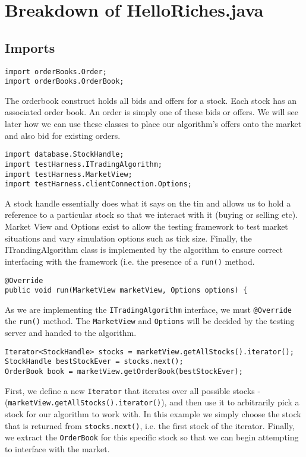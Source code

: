 \documentclass[11pt]{article}
\begin{document}
\section{Breakdown of HelloRiches.java}
\subsection{Imports}
\begin{lstlisting}
import orderBooks.Order;
import orderBooks.OrderBook;
\end{lstlisting}
The orderbook construct holds all bids and offers for a stock. Each stock has an associated order book. An order is simply one of these bids or offers. We will see later how we can use these classes to place our algorithm's offers onto the market and also bid for existing orders.\\
\begin{lstlisting}
import database.StockHandle;
import testHarness.ITradingAlgorithm;
import testHarness.MarketView;
import testHarness.clientConnection.Options;
\end{lstlisting}
A stock handle essentially does what it says on the tin and allows us to hold a reference to a particular stock so that we interact with it (buying or selling etc). Market View and Options exist to allow the testing framework to test market situations and vary simulation options such as tick size. Finally, the ITrandingAlgorithm class is implemented by the algorithm to ensure correct interfacing with the framework (i.e. the presence of a \texttt{run()} method.\\

\begin{lstlisting}
@Override
public void run(MarketView marketView, Options options) {
\end{lstlisting}
As we are implementing the \texttt{ITradingAlgorithm} interface, we must \texttt{@Override} the \texttt{run()} method. The \texttt{MarketView} and \texttt{Options} will be decided by the testing server and handed to the algorithm. \\

\begin{lstlisting}
Iterator<StockHandle> stocks = marketView.getAllStocks().iterator();
StockHandle bestStockEver = stocks.next();
OrderBook book = marketView.getOrderBook(bestStockEver);
\end{lstlisting}
First, we define a new \texttt{Iterator} that iterates over all possible stocks -(\texttt{marketView.getAllStocks().iterator()}), and then use it to arbitrarily pick a stock for our algorithm to work with. In this example we simply choose the stock that is returned from \texttt{stocks.next()}, i.e. the first stock of the iterator. Finally, we extract the \texttt{OrderBook} for this specific stock so that we can begin attempting to interface with the market.\\
\end{document}
